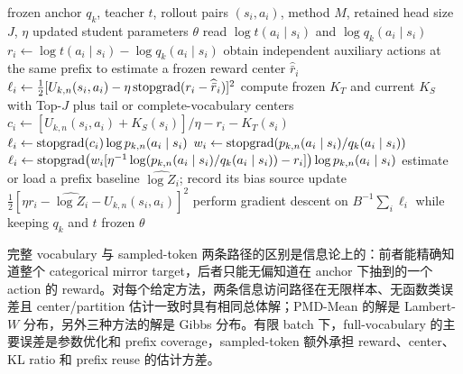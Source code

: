 \begin{algorithm}[ht]
\caption{OPD sampled-token inner update\\{\small\textit{Semantics: 每个 prefix 只访问 rollout 的下一个 token}}}
\begin{algorithmic}[1]
\Require frozen anchor $q_k$, teacher $t$, rollout pairs $(s_i,a_i)$, method $M$, retained head size $J$, $\eta$
\Ensure updated student parameters $\theta$
    \State read $\log t(a_i\mid s_i)$ and $\log q_k(a_i\mid s_i)$
    \State $r_i\gets\log t(a_i\mid s_i)-\log q_k(a_i\mid s_i)$
        \State obtain independent auxiliary actions at the same prefix to estimate a frozen reward center $\widehat{\bar r}_i$
        \State $\ell_i\gets\frac12[U_{k,n}(s_i,a_i)-\eta\operatorname{stopgrad}(r_i-\widehat{\bar r}_i)]^2$
        \State compute frozen $K_T$ and current $K_S$ with Top-$J$ plus tail or complete-vocabulary centers
        \State $c_i\gets[U_{k,n}(s_i,a_i)+K_S(s_i)]/\eta-r_i-K_T(s_i)$
        \State $\ell_i\gets\operatorname{stopgrad}(c_i)\log p_{k,n}(a_i\mid s_i)$
        \State $w_i\gets\operatorname{stopgrad}\!\left(p_{k,n}(a_i\mid s_i)/q_k(a_i\mid s_i)\right)$
        \State $\ell_i\gets\operatorname{stopgrad}\!\left(w_i[\eta^{-1}\log(p_{k,n}(a_i\mid s_i)/q_k(a_i\mid s_i))-r_i]\right)\log p_{k,n}(a_i\mid s_i)$
        \State estimate or load a prefix baseline $\widehat{\log Z_i}$; record its bias source
        \State update $\frac12[\eta r_i-\widehat{\log Z_i}-U_{k,n}(s_i,a_i)]^2$
    \EndIf
\EndFor
\State perform gradient descent on $B^{-1}\sum_i\ell_i$ while keeping $q_k$ and $t$ frozen
\State \Return $\theta$
\end{algorithmic}
\end{algorithm}

完整 vocabulary 与 sampled-token 两条路径的区别是信息论上的：前者能精确知道整个 categorical mirror target，后者只能无偏知道在 anchor 下抽到的一个 action 的 reward。对每个给定方法，两条信息访问路径在无限样本、无函数类误差且 center/partition 估计一致时具有相同总体解；PMD-Mean 的解是 Lambert-$W$ 分布，另外三种方法的解是 Gibbs 分布。有限 batch 下，full-vocabulary 的主要误差是参数优化和 prefix coverage，sampled-token 额外承担 reward、center、KL ratio 和 prefix reuse 的估计方差。

